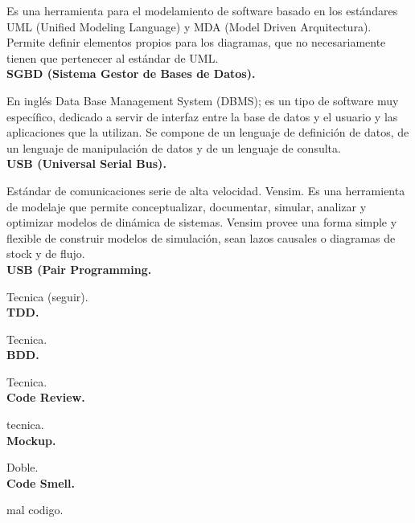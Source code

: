 \documentclass[../pfc.tex]{subfiles}
\begin{document}
	Es una herramienta para el modelamiento de software basado en los estándares UML
	(Unified Modeling Language) y MDA (Model Driven Arquitectura). Permite definir elementos
	propios para los diagramas, que no necesariamente tienen que pertenecer al estándar de UML.\\
	
	\textbf{SGBD (Sistema Gestor de Bases de Datos).}
	
	En inglés Data Base Management System (DBMS); es
	un tipo de software muy específico, dedicado a servir de interfaz entre la base de datos y el usuario
	y las aplicaciones que la utilizan. Se compone de un lenguaje de definición de datos, de un lenguaje
	de manipulación de datos y de un lenguaje de consulta.\\
	
	\textbf{USB (Universal Serial Bus).}
	
	Estándar de comunicaciones serie de alta velocidad.
	Vensim. Es una herramienta de modelaje que permite conceptualizar, documentar, simular,
	analizar y optimizar modelos de dinámica de sistemas. Vensim provee una forma simple y flexible
	de construir modelos de simulación, sean lazos causales o diagramas de stock y de flujo.\\
	
	\textbf{USB (Pair Programming.}
	
	Tecnica (seguir).\\
	
	\textbf{TDD.}
	
	Tecnica.\\
	
	\textbf{BDD.}
	
	Tecnica.\\
	
	\textbf{Code Review.}
	
	tecnica.\\
	
	\textbf{Mockup.}
	
	Doble.\\
	
	\textbf{Code Smell.}
	
	mal codigo.\\
\end{document}
